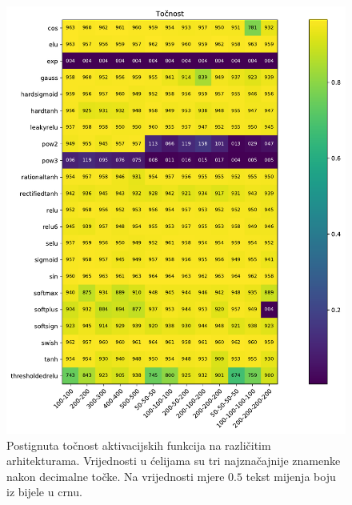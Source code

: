 \documentclass[times, utf8, numeric, diplomski]{fer}
\begin{document}
\begin{figure}[H]
\includegraphics[width=\textwidth]{greedy_9_acc.pdf}
\centering
\caption{Postignuta točnost aktivacijskih funkcija na različitim arhitekturama. Vrijednosti u ćelijama su tri najznačajnije znamenke nakon decimalne točke. Na vrijednosti mjere $0.5$ tekst mijenja boju iz bijele u crnu.}
\label{fig:greedy_9_acc}
\end{figure}
\end{document}
